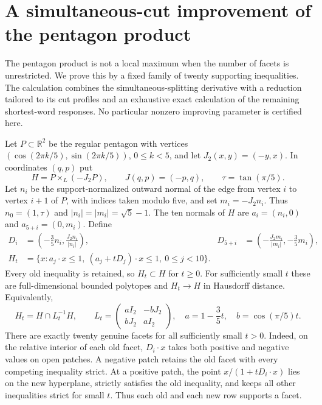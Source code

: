 \section{A simultaneous-cut improvement of the pentagon product}
\label{sec:hko-ascent}

The pentagon product is not a local maximum when the number of facets is
unrestricted. We prove this by a fixed family of twenty supporting
inequalities. The calculation combines the simultaneous-splitting derivative
with a reduction tailored to its cut profiles and an exhaustive exact
calculation of the remaining shortest-word responses. No particular nonzero
improving parameter is certified here.

Let $P\subset\mathbb R^2$ be the regular pentagon with vertices
$(\cos(2\pi k/5),\sin(2\pi k/5))$, $0\leq k<5$, and let
$J_2(x,y)=(-y,x)$. In coordinates $(q,p)$ put
\[
 H=P\times_L(-J_2P),\qquad
 J(q,p)=(-p,q),\qquad \tau=\tan(\pi/5).
\]
Let $n_i$ be the support-normalized outward normal of the edge from vertex
$i$ to vertex $i+1$ of $P$, with indices taken modulo five, and set
$m_i=-J_2n_i$. Thus $n_0=(1,\tau)$ and
$|n_i|=|m_i|=\sqrt5-1$. The ten normals of $H$ are
$a_i=(n_i,0)$ and $a_{5+i}=(0,m_i)$. Define
\begin{align}
 D_i&=\left(-\frac35n_i,\frac{J_2n_i}{|n_i|}\right),&
 D_{5+i}&=\left(-\frac{J_2m_i}{|m_i|},-\frac35m_i\right),
 \label{eq:ha-directions}\\
 H_t&=\{x:a_j\cdot x\leq1,\ (a_j+tD_j)\cdot x\leq1,
                         \ 0\leq j<10\}.\label{eq:ha-family}
\end{align}
Every old inequality is retained, so $H_t\subset H$ for $t\geq0$.
For sufficiently small $t$ these are full-dimensional bounded polytopes and
$H_t\to H$ in Hausdorff distance. Equivalently,
\[
 H_t=H\cap L_t^{-1}H,\qquad
 L_t=\begin{pmatrix}aI_2&-bJ_2\\ bJ_2&aI_2\end{pmatrix},\quad
 a=1-\frac35t,\quad b=\cos(\pi/5)t.
\]
There are exactly twenty genuine facets for all sufficiently small $t>0$.
Indeed, on the relative interior of each old facet, $D_i\cdot x$ takes
both positive and negative values on open patches. A negative patch retains
the old facet with every competing inequality strict. At a positive patch,
the point $x/(1+tD_i\cdot x)$ lies on the new hyperplane, strictly satisfies
the old inequality, and keeps all other inequalities strict for small $t$.
Thus each old and each new row supports a facet.

